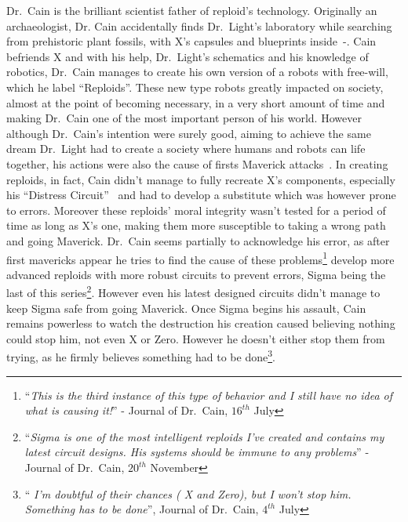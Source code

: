 Dr.~Cain is the brilliant scientist father of reploid's technology. Originally an archaeologist, Dr. Cain accidentally finds Dr.~Light's laboratory while searching from prehistoric plant fossils, with X's capsules and blueprints inside~\cite{wiki:Cain_journal}-\cite{elysium_Cain_journal}. Cain befriends X and with his help, Dr.~Light's schematics and his knowledge of robotics, Dr.~Cain manages to create his own version of a robots with free-will, which he label ``Reploids''. These new type robots greatly impacted on society, almost at the point of becoming necessary, in a very short amount of time and making Dr.~Cain one of the most important person of his world. However although Dr.~Cain's intention were surely good, aiming to achieve the same dream Dr.~Light had to create a society where humans and robots can life together, his actions were also the cause of firsts Maverick attacks~\cite{book:MH_field_guide}. In creating reploids, in fact, Cain didn't manage to fully recreate X's components, especially his ``Distress Circuit''~\cite{book:RMZ_Complete_works} and had to develop a substitute which was however prone to errors. Moreover these reploids' moral integrity wasn't tested for a period of time as long as X's one, making them more susceptible to taking a wrong path and going Maverick. Dr.~Cain seems partially to acknowledge his error, as after first mavericks appear he tries to find the cause of these problems\footnote{``\textit{This is the third instance of this type of behavior and I still have no idea of what is causing it!}'' - Journal of Dr.~Cain, $16^{th}$ July} develop more advanced reploids with more robust circuits to prevent errors, Sigma being the last of this series\footnote{``\textit{Sigma is one of the most intelligent reploids I've created and contains my latest circuit designs. His systems should be immune to any problems}'' - Journal of Dr.~Cain, $20^{th}$ November}. However even his latest designed circuits didn't manage to keep Sigma safe from going Maverick. Once Sigma begins his assault, Cain remains powerless to watch the destruction his creation caused believing nothing could stop him, not even X or Zero. However he doesn't either stop them from trying, as  he firmly believes something had to be done\footnote{``\textit{ I'm doubtful of their chances ( X and Zero), but I won't stop him. Something has to be done}'', Journal of Dr.~Cain, $4^{th}$ July}.

